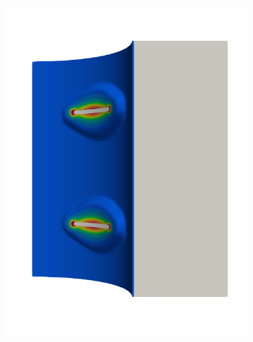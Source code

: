 \begin{frame}
\begin{columns}[T]
\begin{column}{0.6\textwidth}
\begin{figure}
{\begin{subfigure}{0.19\textwidth}
            \includegraphics[width=\textwidth]{Chapter345/figures/seed_ep_4}
          \end{subfigure}
        }
        

\end{figure}
\end{column}
\end{columns}
\end{frame}
